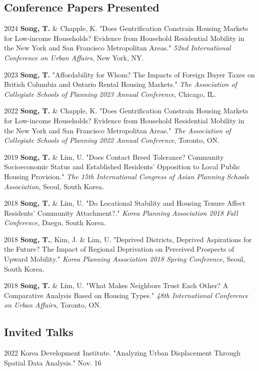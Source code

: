 \documentclass[12pt,letterpaper]{report}
\begin{document}
    \subsection*{Conference Papers Presented}
    \begin{tablist}
      \item[2024] \tab{}\textbf{Song, T.} \& Chapple, K. "Does Gentrification Constrain Housing Markets for Low-income Households? Evidence from Household Residential Mobility in the New York and San Francisco Metropolitan Areas." \emph{52nd International Conference on Urban Affairs}, New York, NY.
      \item[2023] \tab{}\textbf{Song, T.} "Affordability for Whom? The Impacts of Foreign Buyer Taxes on British Columbia and Ontario Rental Housing Markets." \emph{The Association of Collegiate Schools of Planning 2023 Annual Conference}, Chicago, IL.
      \item[2022] \tab{}\textbf{Song, T.} \& Chapple, K. "Does Gentrification Constrain Housing Markets for Low-income Households? Evidence from Household Residential Mobility in the New York and San Francisco Metropolitan Areas." \emph{The Association of Collegiate Schools of Planning 2022 Annual Conference}, Toronto, ON.
      \item[2019] \tab{}\textbf{Song, T.} \& Lim, U. "Does Contact Breed Tolerance? Community Socioeconomic Status and Established Residents' Opposition to Local Public Housing Provision." \emph{The 15th International Congress of Asian Planning Schools Association}, Seoul, South Korea.
      \item[2018] \tab{}\textbf{Song, T.} \& Lim, U.  "Do Locational Stability and Housing Tenure Affect Residents' Community Attachment?." \emph{Korea Planning Association 2018 Fall Conference}, Daegu, South Korea.
      \item[2018] \tab{}\textbf{Song, T.}, Kim, J. \& Lim, U. "Deprived Districts, Deprived Aspirations for the Future? The Impact of Regional Deprivation on Perceived Prospects of Upward Mobility." \emph{Korea Planning Association 2018 Spring Conference}, Seoul, South Korea.
        \item[2018] \tab{}\textbf{Song, T.} \& Lim, U. "What Makes Neighbors Trust Each Other? A Comparative Analysis Based on Housing Types." \emph{48th International Conference on Urban Affairs}, Toronto, ON.
    \end{tablist}
    \subsection*{Invited Talks}
    \begin{tablist}
    \item[2022] \tab{}Korea Development Institute. "Analyzing Urban Displacement Through Spatial Data Analysis." Nov. 16
    \end{tablist}
\end{document}
